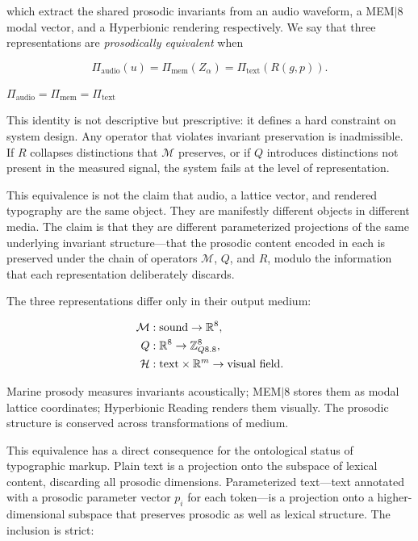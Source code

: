 \documentclass[12pt, a4paper]{article}
\newcommand{\hyperstrong}[1]{\textbf{\Large #1}}
\begin{document}
which extract the shared prosodic invariants from an audio waveform, a MEM$|$8 modal vector, and a Hyperbionic rendering respectively. We say that three representations are \emph{prosodically equivalent} when

\begin{equation}
\Pi_{\mathrm{audio}}(u) = \Pi_{\mathrm{mem}}(Z_\alpha) = \Pi_{\mathrm{text}}(R(g, p)).
\label{eq:equiv}
\end{equation}

\begin{center}
\hyperstrong{$\Pi_{\mathrm{audio}} = \Pi_{\mathrm{mem}} = \Pi_{\mathrm{text}}$}
\end{center}

\noindent This identity is not descriptive but prescriptive: it defines a hard constraint on system design. Any operator that violates invariant preservation is inadmissible. If $R$ collapses distinctions that $\mathcal{M}$ preserves, or if $Q$ introduces distinctions not present in the measured signal, the system fails at the level of representation.

This equivalence is not the claim that audio, a lattice vector, and rendered typography are the same object. They are manifestly different objects in different media. The claim is that they are different parameterized projections of the same underlying invariant structure---that the prosodic content encoded in each is preserved under the chain of operators $\mathcal{M}$, $Q$, and $R$, modulo the information that each representation deliberately discards.

The three representations differ only in their output medium:

\begin{align}
\mathcal{M} &: \text{sound} \to \mathbb{R}^8, \notag\\
Q &: \mathbb{R}^8 \to \mathbb{Z}_{Q8.8}^8, \notag\\
\mathcal{H} &: \text{text} \times \mathbb{R}^m \to \text{visual field}. \notag
\end{align}

Marine prosody measures invariants acoustically; MEM$|$8 stores them as modal lattice coordinates; Hyperbionic Reading renders them visually. The prosodic structure is conserved across transformations of medium.

This equivalence has a direct consequence for the ontological status of typographic markup. Plain text is a projection onto the subspace of lexical content, discarding all prosodic dimensions. Parameterized text---text annotated with a prosodic parameter vector $p_i$ for each token---is a projection onto a higher-dimensional subspace that preserves prosodic as well as lexical structure. The inclusion is strict:
\end{document}
